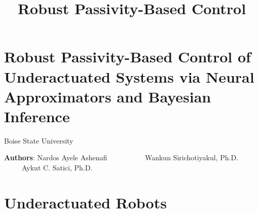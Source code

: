 \documentclass[
]{report}
\title{Robust Passivity-Based Control}
\author{}
\date{}
\renewcommand*\contentsname{Table of contents}
\newcommand\contentsname{Table of contents}
\begin{document}
\maketitle
\ifdefined\Shaded\renewenvironment{Shaded}{\begin{tcolorbox}[sharp corners, interior hidden, frame hidden, boxrule=0pt, breakable, borderline west={3pt}{0pt}{shadecolor}, enhanced]}{\end{tcolorbox}}\fi

\renewcommand*\contentsname{Table of contents}
{
\hypersetup{linkcolor=}
\setcounter{tocdepth}{2}
\tableofcontents
}
\hypertarget{robust-passivity-based-control-of-underactuated-systems-via-neural-approximators-and-bayesian-inference}{%
\section{Robust Passivity-Based Control of Underactuated Systems via
Neural Approximators and Bayesian
Inference}\label{robust-passivity-based-control-of-underactuated-systems-via-neural-approximators-and-bayesian-inference}}

Boise State University

\textbf{Authors}: Nardos Ayele Ashenafi           ~ Wankun
Sirichotiyakul, Ph.D.~           ~ Aykut C. Satici, Ph.D.~

\hypertarget{underactuated-robots}{%
\section{Underactuated Robots}\label{underactuated-robots}}
\end{document}
